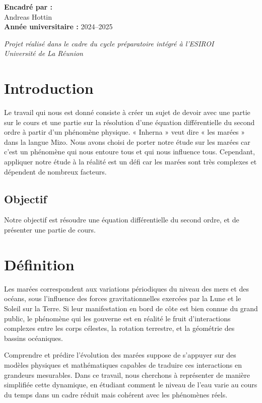 \documentclass[a4paper,12pt,openany,oneside]{article}
\begin{document}
\begin{titlepage}
\begin{flushleft}
        \textbf{Encadré par :}\\
        Andreas Hottin\\[0.5cm]
    
        
    
        \textbf{Année universitaire :} 2024–2025\\[1cm]
    \end{flushleft}
    
    \vfill
    
    \begin{center}
        \textit{Projet réalisé dans le cadre du cycle préparatoire intégré à l'ESIROI}\\
        \textit{Université de La Réunion}
    \end{center}
    
    
\end{titlepage}

\section{Introduction}
Le travail qui nous est donné consiste à créer un sujet de devoir avec une partie sur le cours et une partie sur la résolution d'une équation différentielle du second ordre à partir d'un phénomène physique.
« Inherna » veut dire « les marées » dans la langue Mizo. Nous avons choisi de porter notre étude sur les marées car c'est un phénomène qui nous entoure tous et qui nous influence tous.
Cependant, appliquer notre étude à la réalité est un défi car les marées sont très complexes et dépendent de nombreux facteurs.

\subsection{Objectif}
Notre objectif est résoudre une équation différentielle du second ordre, et de présenter une partie de cours.

\section{Définition}
Les marées correspondent aux variations périodiques du niveau des mers et des océans, sous l'influence des forces gravitationnelles exercées par la Lune et le Soleil sur la Terre. Si leur manifestation en bord de côte est bien connue du grand public, le phénomène qui les gouverne est en réalité le fruit d'interactions complexes entre les corps célestes, la rotation terrestre, et la géométrie des bassins océaniques.

Comprendre et prédire l'évolution des marées suppose de s'appuyer sur des modèles physiques et mathématiques capables de traduire ces interactions en grandeurs mesurables. Dans ce travail, nous cherchons à représenter de manière simplifiée cette dynamique, en étudiant comment le niveau de l'eau varie au cours du temps dans un cadre réduit mais cohérent avec les phénomènes réels.
\end{document}
